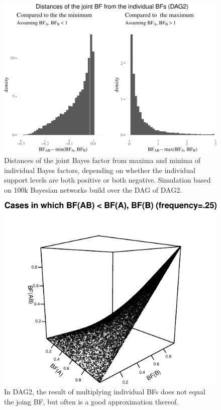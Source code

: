 \documentclass[
  10pt,
  dvipsnames,enabledeprecatedfontcommands]{scrartcl}
\begin{document}
\begin{figure}

\begin{center}\includegraphics[width=1\linewidth]{conjunction-appendix13_files/figure-latex/BFind2-1} \end{center}

\caption{Distances of the joint Bayes factor from maxima and minima of individual Bayes factors, depending on whether the individual support levels are both positive or both negative. Simulation based on 100k Bayesian networks build over the DAG of \textsf{DAG2}.}
\label{fig:BFind2}
\end{figure}

\begin{figure}

\begin{center}\includegraphics[width=1\linewidth]{conjunction-appendix13_files/figure-latex/unnamed-chunk-13-1} \end{center}
\caption{In DAG2, the result of multiplying individual BFs does not equal the joing BF, but often is a good approximation thereof.}
\label{fig:BFmulti}
\end{figure}
\end{document}
